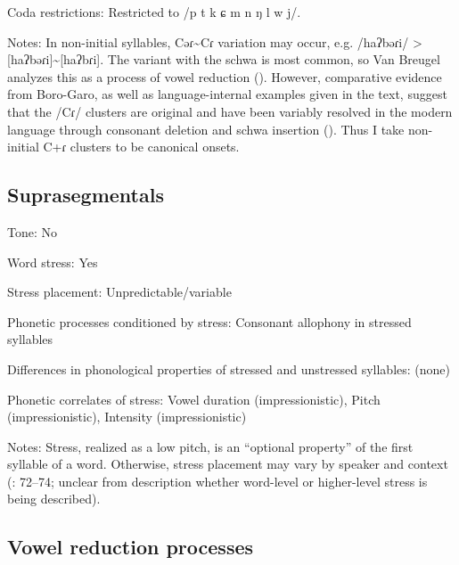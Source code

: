 {\begin{appendixdesc}
\item[Coda restrictions:] Restricted to /p t k ɕ m n ŋ l w j/. 

\item[Notes:] In non-initial syllables, Cəɾ{\textasciitilde}Cɾ variation may occur, e.g. /haʔbəɾi/ > [haʔbəɾi]{\textasciitilde}[haʔbɾi]. The variant with the schwa is most common, so Van Breugel analyzes this as a process of vowel reduction (\citeyear[43]{VanBreugel2008}). However, comparative evidence from Boro-Garo, as well as language-internal examples given in the text, suggest that the /Cɾ/ clusters are original and have been variably resolved in the modern language through consonant deletion and schwa insertion (\citeyear[30--32]{VanBreugel2008}). Thus I take non-initial C+ɾ clusters to be canonical onsets.
\end{appendixdesc}
\subsection*{Suprasegmentals}
\begin{appendixdesc}
\item[Tone:] No

\item[Word stress:] Yes

\item[Stress placement:] Unpredictable/variable

\item[Phonetic processes conditioned by stress:] Consonant allophony in stressed syllables

\item[Differences in phonological properties of stressed and unstressed syllables:] (none)

\item[Phonetic correlates of stress:] Vowel duration (impressionistic), Pitch (impressionistic), Intensity (impressionistic)

\item[Notes:] Stress, realized as a low pitch, is an “optional property” of the first syllable of a word. Otherwise, stress placement may vary by speaker and context (\citealt{VanBreugel2008}: 72--74; unclear from description whether word-level or higher-level stress is being described).
\end{appendixdesc}
\subsection*{Vowel reduction processes}
\begin{appendixdesc}


\end{appendixdesc}}
